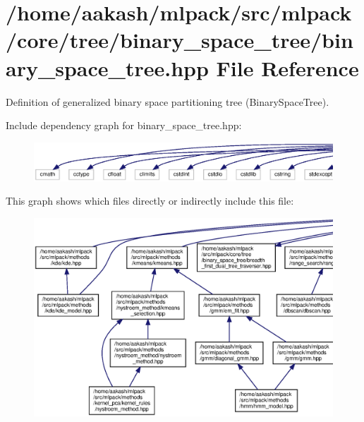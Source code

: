 \section{/home/aakash/mlpack/src/mlpack/core/tree/binary\+\_\+space\+\_\+tree/binary\+\_\+space\+\_\+tree.hpp File Reference}
\label{binary__space__tree_2binary__space__tree_8hpp}


Definition of generalized binary space partitioning tree (Binary\+Space\+Tree).  


Include dependency graph for binary\+\_\+space\+\_\+tree.\+hpp\+:
\nopagebreak
\begin{figure}[H]
\begin{center}
\leavevmode
\includegraphics[width=350pt]{binary__space__tree_2binary__space__tree_8hpp__incl}
\end{center}
\end{figure}
This graph shows which files directly or indirectly include this file\+:
\nopagebreak
\begin{figure}[H]
\begin{center}
\leavevmode
\includegraphics[width=350pt]{binary__space__tree_2binary__space__tree_8hpp__dep__incl}
\end{center}
\end{figure}

